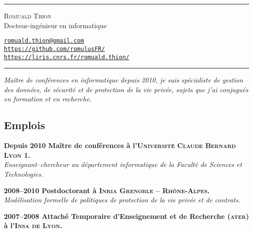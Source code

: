 \documentclass[12pt,a4paper]{article}
\newcommand{\hr}{\textcolor{gris80}{\rule{\linewidth}{0.5pt}}}
\newcommand{\activite}[1]{\textbf{#1}\xspace}
\newcommand{\comment}[1]{\textsl{#1}\xspace}
\newcommand{\INSAL}{\textsc{Insa de Lyon}\xspace}
\newcommand{\INRIARA}{\textsc{Inria Grenoble -- Rh\^one-Alpes}\xspace}
\newcommand{\UCBL}{\textsc{Universit{\'e} Claude Bernard Lyon 1}\xspace}
\newcommand{\ATER}{\textsc{ater}\xspace}
\begin{document}
\hr

\vspace{0.5em}

\begin{minipage}[c]{0.5\textwidth}
  \begin{center}
    {\LARGE\textsc{Romuald Thion}}\\
    Docteur-ingénieur en informatique\\
  \end{center}
\end{minipage}
\begin{minipage}[c]{0.5\textwidth}
  \begin{center}
    \href{mailto:romuald.thion@gmail.com}{\nolinkurl{romuald.thion@gmail.com}}\\
    \href{https://github.com/romulusFR/}{\nolinkurl{https://github.com/romulusFR/}}\\
    \href{https://liris.cnrs.fr/romuald.thion/}{\nolinkurl{https://liris.cnrs.fr/romuald.thion/}}
  \end{center}
\end{minipage}

\vspace{0.5em}

\hr

\begin{center}
  \emph{Maître de conférences en informatique depuis 2010, je suis spécialiste de gestion des données, de sécurité et de protection de la vie privée, sujets que j'ai conjugués en formation et en recherche.}
\end{center}

\subsection*{Emplois} 

    \activite{Depuis 2010 Maître de conférences à l'\UCBL.}\\
    \comment{Enseignant--chercheur au département informatique de la Faculté de Sciences et Technologies.} 
    
    \activite{2008--2010 Postdoctorant à \INRIARA.}\\
    \comment{Modélisation formelle de politiques de protection de la vie privée et de contrats.} 
    
    \activite{2007--2008 Attaché Temporaire d'Enseignement et de Recherche (\ATER) à l'\INSAL.}
\end{document}
